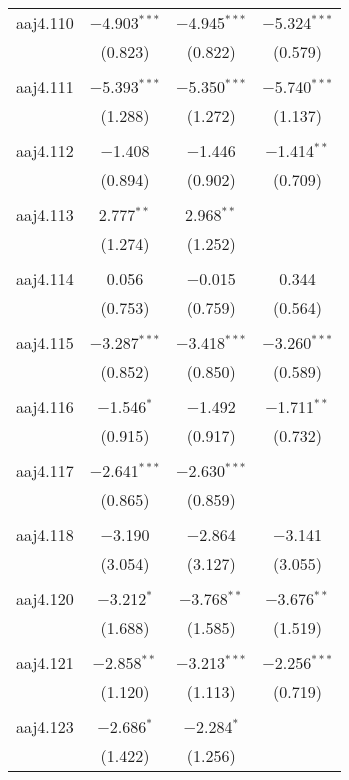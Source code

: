 \begin{table}[!htbp]
\begin{tabular}{@{\extracolsep{5pt}}lccc}
 aaj4.110 & $-$4.903$^{***}$ & $-$4.945$^{***}$ & $-$5.324$^{***}$ \\ 
  & (0.823) & (0.822) & (0.579) \\ 
  & & & \\ 
 aaj4.111 & $-$5.393$^{***}$ & $-$5.350$^{***}$ & $-$5.740$^{***}$ \\ 
  & (1.288) & (1.272) & (1.137) \\ 
  & & & \\ 
 aaj4.112 & $-$1.408 & $-$1.446 & $-$1.414$^{**}$ \\ 
  & (0.894) & (0.902) & (0.709) \\ 
  & & & \\ 
 aaj4.113 & 2.777$^{**}$ & 2.968$^{**}$ &  \\ 
  & (1.274) & (1.252) &  \\ 
  & & & \\ 
 aaj4.114 & 0.056 & $-$0.015 & 0.344 \\ 
  & (0.753) & (0.759) & (0.564) \\ 
  & & & \\ 
 aaj4.115 & $-$3.287$^{***}$ & $-$3.418$^{***}$ & $-$3.260$^{***}$ \\ 
  & (0.852) & (0.850) & (0.589) \\ 
  & & & \\ 
 aaj4.116 & $-$1.546$^{*}$ & $-$1.492 & $-$1.711$^{**}$ \\ 
  & (0.915) & (0.917) & (0.732) \\ 
  & & & \\ 
 aaj4.117 & $-$2.641$^{***}$ & $-$2.630$^{***}$ &  \\ 
  & (0.865) & (0.859) &  \\ 
  & & & \\ 
 aaj4.118 & $-$3.190 & $-$2.864 & $-$3.141 \\ 
  & (3.054) & (3.127) & (3.055) \\ 
  & & & \\ 
 aaj4.120 & $-$3.212$^{*}$ & $-$3.768$^{**}$ & $-$3.676$^{**}$ \\ 
  & (1.688) & (1.585) & (1.519) \\ 
  & & & \\ 
 aaj4.121 & $-$2.858$^{**}$ & $-$3.213$^{***}$ & $-$2.256$^{***}$ \\ 
  & (1.120) & (1.113) & (0.719) \\ 
  & & & \\ 
 aaj4.123 & $-$2.686$^{*}$ & $-$2.284$^{*}$ &  \\ 
  & (1.422) & (1.256) &  \\ 

\end{tabular}
\end{table}
